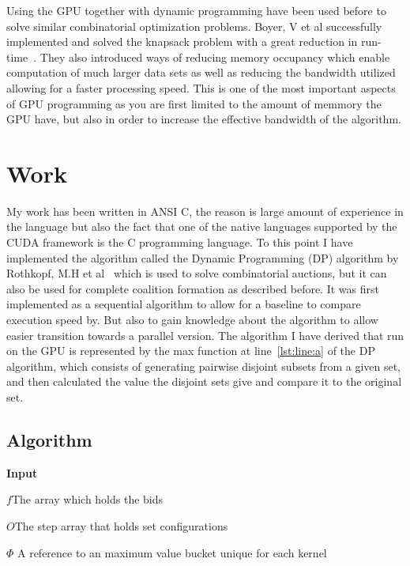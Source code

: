 \documentclass[a4paper, 12pt]{report}
\begin{document}
Using the GPU together with dynamic programming have been used before to solve similar combinatorial optimization problems. Boyer, V et al successfully implemented and solved the knapsack problem with a great reduction in run-time~\cite{boyer2012solving}. They also introduced ways of reducing memory occupancy which enable computation of much larger data sets as well as reducing the bandwidth utilized allowing for a faster processing speed. This is one of the most important aspects of GPU programming as you are first limited to the amount of memmory the GPU have, but also in order to increase the effective bandwidth of the algorithm.





\section{Work}
My work has been written in ANSI C, the reason is large amount of experience in the language but also the fact that one of the native languages supported by the CUDA framework is the C programming language.
To this point I have implemented the algorithm called the Dynamic Programming (DP) algorithm by Rothkopf, M.H et al~\cite{rothkopf1998computationally} which is used to solve combinatorial auctions, but it can also be used for complete coalition formation as described before. It was first implemented as a sequential algorithm to allow for a baseline to compare execution speed by. But also to gain knowledge about the algorithm to allow easier transition towards a parallel version. The algorithm I have derived that run on the GPU is represented by the max function at line~\ref{lst:line:a} of the DP algorithm, which consists of generating pairwise disjoint subsets from a given set, and then calculated the value the disjoint sets give and compare it to the original set. 

\thispagestyle{empty}

\thispagestyle{empty}
\pagestyle{empty}
\subsection{Algorithm}
\textbf{Input}

$f$\hfill The array which holds the bids

$O$\hfill The step array that holds set configurations

$ \Phi $ \hfill A reference to an maximum value bucket unique for each kernel
\end{document}
